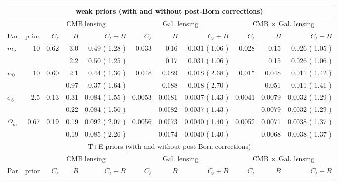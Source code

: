 \documentclass[11pt]{article} %
\newcommand{\greenfactor}[1]{%
    \pgfmathsetmacro{\value}{min(100,round(100*(#1-1)))}%
    \textcolor{green!80!black!\value!black}{#1}%
}
\begin{document}
\begin{table}
\centering
\scriptsize
\begin{tabular}{|l|r|rrr|rrr|rrr|}
\hline
\multicolumn{11}{|c|}{weak priors (with and without post-Born corrections)} \\
\hline
&& \multicolumn{3}{c|}{CMB lensing} & \multicolumn{3}{c|}{Gal. lensing} & \multicolumn{3}{c|}{CMB $\times$ Gal. lensing} \\
\hline
Par & prior & $C_\ell$ & $B$ & $C_\ell+B$ & $C_\ell$ & $B$ & $C_\ell+B$ & $C_\ell$ & $B$ & $C_\ell+B$ \\
\hline
$m_\nu$    & 10 & 0.62 & 3.0 & 0.49 (\greenfactor{1.28}) & 0.033 & 0.16 & 0.031 (\greenfactor{1.06}) & 0.028 & 0.15 & 0.026 (\greenfactor{1.05}) \\
\rowcolor{blue!10}
           &    &      & 2.2 & 0.50 (\greenfactor{1.25}) &      & 0.17 & 0.031 (\greenfactor{1.06}) &      & 0.15 & 0.026 (\greenfactor{1.06}) \\
$w_0$      & 10 & 0.60 & 2.1 & 0.44 (\greenfactor{1.36}) & 0.048 & 0.089 & 0.018 (\greenfactor{2.68}) & 0.015 & 0.048 & 0.011 (\greenfactor{1.42}) \\
\rowcolor{blue!10}
           &    &      & 0.97 & 0.37 (\greenfactor{1.64}) &      & 0.088 & 0.018 (\greenfactor{2.70}) &      & 0.051 & 0.011 (\greenfactor{1.41}) \\
$\sigma_8$ & 2.5 & 0.13 & 0.31 & 0.084 (\greenfactor{1.55}) & 0.0053 & 0.0081 & 0.0037 (\greenfactor{1.43}) & 0.0041 & 0.0079 & 0.0032 (\greenfactor{1.29}) \\
\rowcolor{blue!10}
           &     &      & 0.22 & 0.084 (\greenfactor{1.56}) &      & 0.0082 & 0.0037 (\greenfactor{1.43}) &      & 0.0079 & 0.0032 (\greenfactor{1.29}) \\
$\Omega_m$ & 0.67 & 0.19 & 0.19 & 0.092 (\greenfactor{2.07}) & 0.0056 & 0.0073 & 0.0040 (\greenfactor{1.40}) & 0.0052 & 0.0071 & 0.0038 (\greenfactor{1.37}) \\
\rowcolor{blue!10}
           &      &      & 0.19 & 0.085 (\greenfactor{2.26}) &      & 0.0074 & 0.0040 (\greenfactor{1.40}) &      & 0.0068 & 0.0038 (\greenfactor{1.37}) \\
\hline
\multicolumn{11}{|c|}{T+E priors (with and without post-Born corrections)} \\
\hline
&& \multicolumn{3}{c|}{CMB lensing} & \multicolumn{3}{c|}{Gal. lensing} & \multicolumn{3}{c|}{CMB $\times$ Gal. lensing} \\
\hline
Par & prior & $C_\ell$ & $B$ & $C_\ell+B$ & $C_\ell$ & $B$ & $C_\ell+B$ & $C_\ell$ & $B$ & $C_\ell+B$ \\

\end{tabular}
\end{table}
\end{document}
